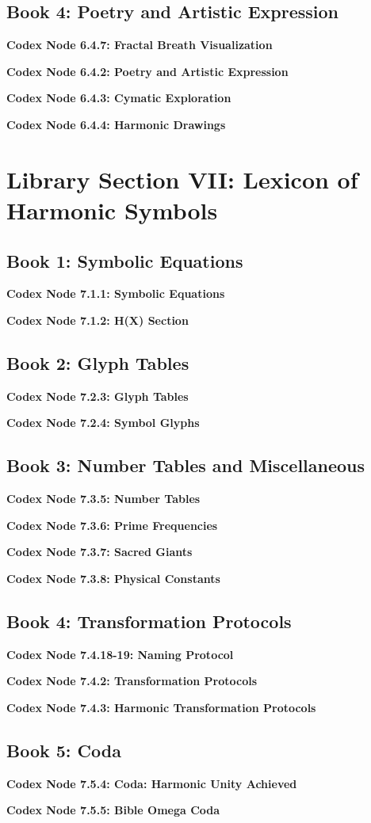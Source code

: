 \documentclass[a4paper,12pt]{book}
\newcommand{\codexnode}[5]{%
  \par\vspace{0.5em}%
  \noindent\textbf{Codex Node #1.#2.#3: #5}\label{#4}%
  \par\vspace{0.5em}%
}
\begin{document}
\subsection{Book 4: Poetry and Artistic Expression}
\codexnode{6}{4}{7}{section6/book4/codex_fractal_breath_visualization}{Fractal Breath Visualization}
\codexnode{6}{4}{2}{section6/book4/chapter4_poetry_and_artistic_expression}{Poetry and Artistic Expression}
\codexnode{6}{4}{3}{section6/book4/chapter4_cymatic_exploration}{Cymatic Exploration}
\codexnode{6}{4}{4}{section6/book4/chapter4_harmonic_drawings}{Harmonic Drawings}

\section{Library Section VII: Lexicon of Harmonic Symbols}

\subsection{Book 1: Symbolic Equations}
\codexnode{7}{1}{1}{section7/book1/chapter1_symbolic_equations}{Symbolic Equations}
\codexnode{7}{1}{2}{section7/book1/h_x_section}{H(X) Section}

\subsection{Book 2: Glyph Tables}
\codexnode{7}{2}{3}{section7/book2/chapter2_glyph_tables}{Glyph Tables}
\codexnode{7}{2}{4}{section7/book2/symbol_glyphs}{Symbol Glyphs}

\subsection{Book 3: Number Tables and Miscellaneous}
\codexnode{7}{3}{5}{section7/book3/number_tables}{Number Tables}
\codexnode{7}{3}{6}{section7/book3/chapter3_prime_frequencies}{Prime Frequencies}
\codexnode{7}{3}{7}{section7/book3/chapter3_sacred_giants}{Sacred Giants}
\codexnode{7}{3}{8}{section7/book3/codex_physical_constants}{Physical Constants}

\subsection{Book 4: Transformation Protocols}
\codexnode{7}{4}{18-19}{section7/book4/codex_naming_protocol}{Naming Protocol}
\codexnode{7}{4}{2}{section7/book4/chapter4_transformation_protocols}{Transformation Protocols}
\codexnode{7}{4}{3}{section7/book4/chapter4_harmonic_transformation_protocols}{Harmonic Transformation Protocols}

\subsection{Book 5: Coda}
\codexnode{7}{5}{4}{section7/book5/chapter5_coda_harmonic_unity_achieved}{Coda: Harmonic Unity Achieved}
\codexnode{7}{5}{5}{section7/book5/codex_bible_omega_coda}{Bible Omega Coda}
\end{document}
